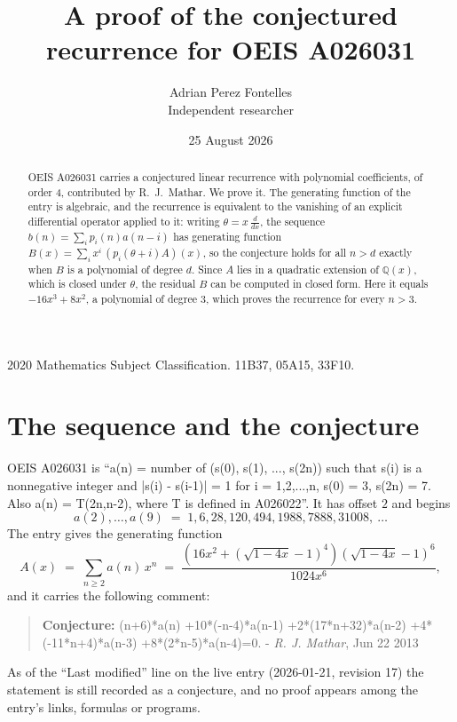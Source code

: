 \documentclass[11pt,a4paper]{article}
\title{A proof of the conjectured recurrence for OEIS A026031}
\author{Adrian Perez Fontelles\\ \small Independent researcher}
\date{25 August 2026}
\theoremstyle{plain}
\theoremstyle{definition}
\begin{document}
\maketitle

\begin{abstract}
OEIS A026031 carries a conjectured linear recurrence with polynomial coefficients, of
order 4, contributed by R.~J.~Mathar. We prove it. The generating function of the
entry is algebraic, and the recurrence is equivalent to the vanishing of an explicit
differential operator applied to it: writing $\theta=x\,\frac{d}{dx}$, the sequence
$b(n)=\sum_{i}p_{i}(n)a(n-i)$ has generating function
$B(x)=\sum_{i}x^{i}\,(p_{i}(\theta+i)A)(x)$, so the conjecture holds for all $n>d$ exactly
when $B$ is a polynomial of degree $d$. Since $A$ lies in a quadratic extension of
$\mathbb{Q}(x)$, which is closed under $\theta$, the residual $B$ can be computed in
closed form. Here it equals $- 16 x^{3} + 8 x^{2}$, a polynomial of degree $3$, which proves
the recurrence for every $n>3$.
\end{abstract}

\noindent\small 2020 Mathematics Subject Classification. 11B37, 05A15, 33F10.\normalsize

\section{The sequence and the conjecture}

OEIS A026031 is ``a(n) = number of (s(0), s(1), ..., s(2n)) such that s(i) is a nonnegative integer and |s(i) - s(i-1)| = 1 for i = 1,2,...,n, s(0) = 3, s(2n) = 7. Also a(n) = T(2n,n-2), where T is defined in A026022''. It has offset $2$ and begins
\[
a(2),\dots,a(9)\;=\;1, 6, 28, 120, 494, 1988, 7888, 31008,\ \dots
\]
The entry gives the generating function
\begin{equation}\label{eq:gf}
A(x)\;=\;\sum_{n\ge 2} a(n)\,x^{n}\;=\;\frac{\left(16 x^{2} + \left(\sqrt{1 - 4 x} - 1\right)^{4}\right) \left(\sqrt{1 - 4 x} - 1\right)^{6}}{1024 x^{6}} ,
\end{equation}
and it carries the following comment:
\begin{quote}\small
\textbf{Conjecture:} (n+6)*a(n) +10*(-n-4)*a(n-1) +2*(17*n+32)*a(n-2) +4*(-11*n+4)*a(n-3) +8*(2*n-5)*a(n-4)=0. - \emph{R. J. Mathar}, Jun 22 2013
\end{quote}
As of the ``Last modified'' line on the live entry (2026-01-21, revision 17) the
statement is still recorded as a conjecture, and no proof appears among the entry's links,
formulas or programs.
\end{document}
